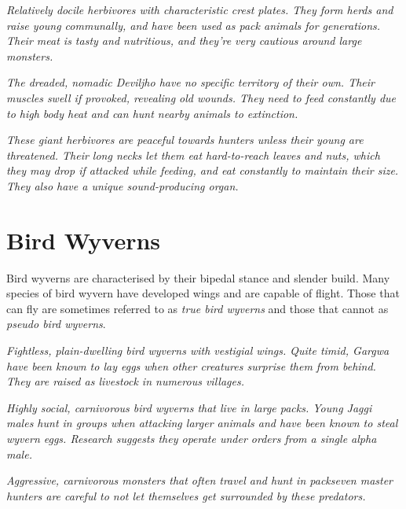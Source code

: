 \textit{Relatively docile herbivores with characteristic crest plates. They form herds and raise young communally, and have been used as pack animals for generations. Their meat is tasty and nutritious, and they're very cautious around large monsters.}

\textit{The dreaded, nomadic Deviljho have no specific territory of their own. Their muscles swell if provoked, revealing old wounds. They need to feed constantly due to high body heat and can hunt nearby animals to extinction.}

\textit{These giant herbivores are peaceful towards hunters unless their young are threatened. Their long necks let them eat hard-to-reach leaves and nuts, which they may drop if attacked while feeding, and eat constantly to maintain their size. They also have a unique sound-producing organ.}

\section{Bird Wyverns}
Bird wyverns are characterised by their bipedal stance and slender build. Many species of bird wyvern have developed wings and are capable of flight. Those that can fly are sometimes referred to as \emph{true bird wyverns} and those that cannot as \emph{pseudo bird wyverns}.

\textit{Fightless, plain-dwelling bird wyverns with vestigial wings. Quite timid, Gargwa have been known to lay eggs when other creatures surprise them from behind. They are raised as livestock in numerous villages.}

\textit{Highly social, carnivorous bird wyverns that live in large packs. Young Jaggi males hunt in groups when attacking larger animals and have been known to steal wyvern eggs. Research suggests they operate under orders from a single alpha male.}

\textit{Aggressive, carnivorous monsters that often travel and hunt in packs\hbNone even master hunters are careful to not let themselves get surrounded by these predators.}

